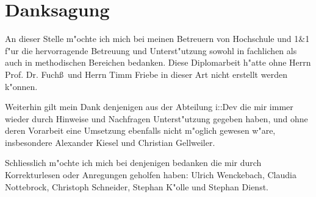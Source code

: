 \chapter*{Danksagung}

An dieser Stelle m"ochte ich mich bei meinen Betreuern von Hochschule und 1\&1 f"ur die hervorragende
Betreuung und Unterst"utzung sowohl in fachlichen als auch in methodischen Bereichen bedanken.
Diese Diplomarbeit h"atte ohne Herrn Prof. Dr. Fuch\ss\ und Herrn Timm Friebe in dieser
Art nicht erstellt werden k"onnen.

Weiterhin gilt mein Dank denjenigen aus der Abteilung i::Dev die mir immer wieder durch Hinweise und 
Nachfragen Unterst"utzung gegeben haben, und ohne deren Vorarbeit eine Umsetzung ebenfalls nicht
m"oglich gewesen w"are, insbesondere Alexander Kiesel und Christian Gellweiler.

Schliesslich m"ochte ich mich bei denjenigen bedanken die mir durch Korrekturlesen oder Anregungen geholfen
haben: Ulrich Wenckebach, Claudia Nottebrock, Christoph Schneider, Stephan K"olle und Stephan Dienst.

